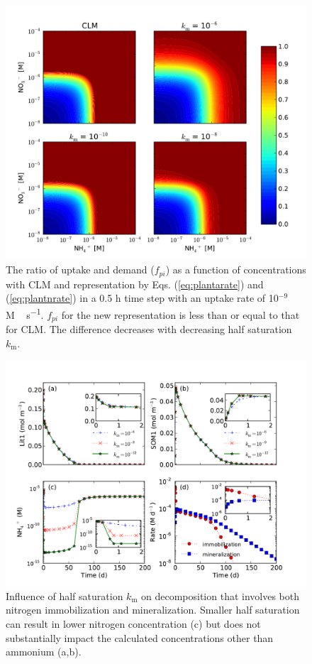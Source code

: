 \documentclass[gmd, manuscript]{copernicus}
\begin{document}
\begin{figure}[t]
\includegraphics[width=12cm]{../figs/fig05/uptakef.pdf}
\caption{The ratio of uptake and demand ($f_{pi}$) as a
function of concentrations with CLM and representation by Eqs.
(\ref{eq:plantarate}) and (\ref{eq:plantnrate}) in a 0.5 h time step with an
uptake rate of 10$^{-9}$ \unit{M\,s^{-1}}. $f_{pi}$ for the new representation
is less than or equal to that for CLM. The difference decreases with decreasing
half saturation $k_\text{m}$.}
\label{fig:demanddistribution}
\end{figure}

\begin{figure}[t]
\includegraphics[width=15cm]{../figs/fig09/figdecomp.pdf}
\caption{Influence of half saturation $k_\text{m}$ on decomposition that involves both
nitrogen immobilization and mineralization. Smaller half saturation can result
in lower nitrogen concentration (c) but does not substantially impact the
calculated concentrations other than ammonium (a,b).}
\label{fig:decomp}
\end{figure}
\end{document}
